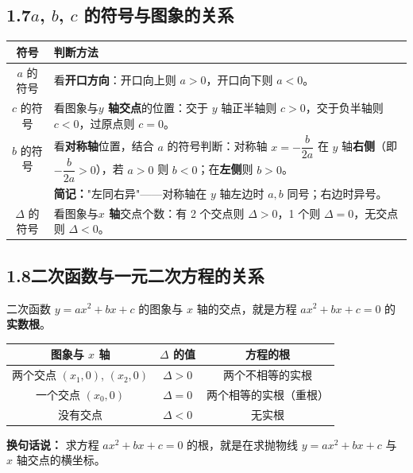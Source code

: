 \documentclass[12pt, a4paper]{ctexart}
\begin{document}
\subsection*{1.7\quad $a$, $b$, $c$ 的符号与图象的关系}

\begin{knowledgebox}
\begin{center}
\renewcommand{\arraystretch}{1.6}
\begin{tabular}{|c|p{10cm}|}
\hline
\textbf{符号} & \textbf{判断方法} \\
\hline
$a$ 的符号 & 看\textbf{开口方向}：开口向上则 $a > 0$，开口向下则 $a < 0$。\\
\hline
$c$ 的符号 & 看图象与\textbf{$y$ 轴交点}的位置：交于 $y$ 轴正半轴则 $c > 0$，交于负半轴则 $c < 0$，过原点则 $c = 0$。\\
\hline
$b$ 的符号 & 看\textbf{对称轴}位置，结合 $a$ 的符号判断：对称轴 $x = -\dfrac{b}{2a}$ 在 $y$ 轴\textbf{右侧}（即 $-\dfrac{b}{2a} > 0$），若 $a > 0$ 则 $b < 0$；在\textbf{左侧}则 $b > 0$。\vspace{2pt}\\
& \textbf{简记：}"左同右异"——对称轴在 $y$ 轴左边时 $a, b$ 同号；右边时异号。\\
\hline
$\Delta$ 的符号 & 看图象与\textbf{$x$ 轴}交点个数：有 2 个交点则 $\Delta > 0$，1 个则 $\Delta = 0$，无交点则 $\Delta < 0$。\\
\hline
\end{tabular}
\end{center}
\end{knowledgebox}

\subsection*{1.8\quad 二次函数与一元二次方程的关系}

\begin{knowledgebox}[核心联系]
二次函数 $y = ax^2 + bx + c$ 的图象与 $x$ 轴的交点，就是方程 $ax^2 + bx + c = 0$ 的\textbf{实数根}。

\begin{center}
\renewcommand{\arraystretch}{1.5}
\begin{tabular}{|c|c|c|}
\hline
\textbf{图象与 $x$ 轴} & \textbf{$\Delta$ 的值} & \textbf{方程的根} \\
\hline
两个交点 $(x_1, 0)$, $(x_2, 0)$ & $\Delta > 0$ & 两个不相等的实根 \\
\hline
一个交点 $(x_0, 0)$ & $\Delta = 0$ & 两个相等的实根（重根） \\
\hline
没有交点 & $\Delta < 0$ & 无实根 \\
\hline
\end{tabular}
\end{center}

\textbf{换句话说：} 求方程 $ax^2 + bx + c = 0$ 的根，就是在求抛物线 $y = ax^2 + bx + c$ 与 $x$ 轴交点的横坐标。
\end{knowledgebox}
\end{document}
